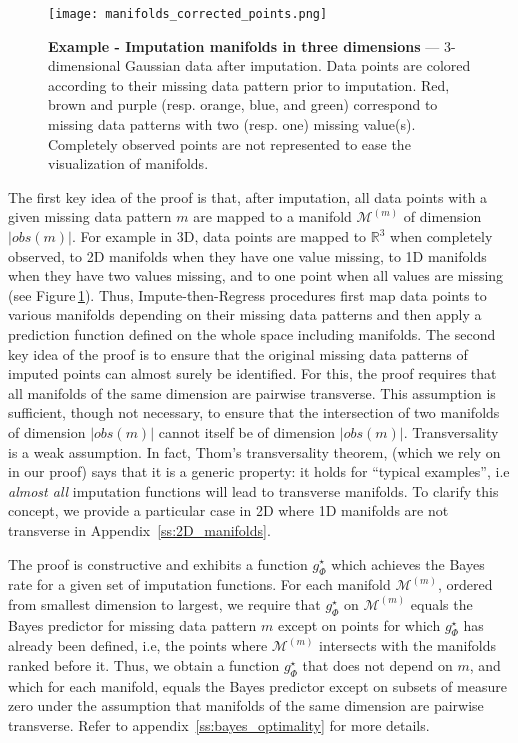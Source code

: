 \documentclass{article}
\newcommand{\RR}{\mathbb{R}}
\newcommand{\Mcal}{\mathcal{M}}
\theoremstyle{plain}
\begin{document}
\begin{figure}[b]
    \begin{minipage}{.52\linewidth}
    \caption{\textbf{Example - Imputation manifolds in three dimensions} --- 3-dimensional Gaussian data after imputation. Data points are colored according to their missing data pattern prior to imputation. Red, brown and purple (resp. orange, blue, and green) correspond to missing data patterns with two (resp. one) missing value(s). Completely observed points are not represented to ease the visualization of manifolds.}
    \label{fig:example_manifolds}
    \end{minipage}%
    \hspace{2em}
    \begin{minipage}{.46\linewidth}
        \texttt{[image: manifolds\_corrected\_points.png]}
    \end{minipage}
\end{figure}

The first key idea of the proof is that, after imputation, all data points with a given missing data pattern $m$ are mapped to a manifold $\Mcal^{(m)}$ of dimension $|obs(m)|$. For example in 3D, data points are mapped to $\RR^3$ when completely observed, to 2D manifolds when they have one value missing, to 1D manifolds when they have two values missing, and to one point when all values are missing (see Figure\,\ref{fig:example_manifolds}). Thus, Impute-then-Regress procedures first map data points to various manifolds depending on their missing data patterns and then apply a prediction function defined on the whole space including manifolds. The second key idea of the proof is to ensure that the original missing data patterns of imputed points can almost surely be identified. For this, the proof requires that all manifolds of the same dimension are pairwise transverse. This assumption is sufficient, though not necessary, to ensure that the intersection of two manifolds of dimension $|obs(m)|$ cannot itself be of dimension $|obs(m)|$. Transversality is a weak assumption. In fact, Thom's transversality theorem, (which we rely on in our proof) says that it is a generic property: it holds for ``typical examples'', i.e \emph{almost all} imputation functions will lead to transverse manifolds. To clarify this concept, we provide a particular case in 2D where 1D manifolds are not transverse in Appendix~\ref{ss:2D_manifolds}.

The proof is constructive and exhibits a function $g^\star_{\Phi}$ which achieves the Bayes rate for a given set of imputation functions. For each manifold $\Mcal^{(m)}$, ordered from smallest dimension to largest, we require that $g^\star_{\Phi}$ on $\Mcal^{(m)}$ equals the Bayes predictor for missing data pattern $m$ except on points for which $g^\star_{\Phi}$ has already been defined, i.e, the points where $\Mcal^{(m)}$ intersects with the manifolds ranked before it. Thus, we obtain a function $g^\star_{\Phi}$ that does not depend on $m$, and which for each manifold, equals the Bayes predictor except on subsets of measure zero under the assumption that manifolds of the same dimension are pairwise transverse. Refer to appendix~\ref{ss:bayes_optimality} for more details.
\end{document}
